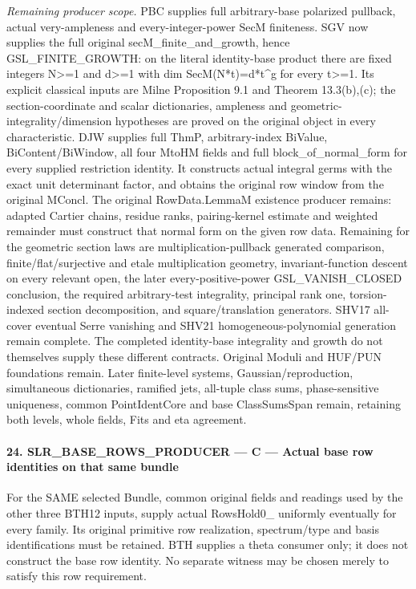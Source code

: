 \documentclass[11pt,a4paper]{article}
\numberwithin{equation}{section}
\theoremstyle{remark}\newtheorem{remark}[theorem]{Remark}
\begin{document}
\emph{Remaining producer scope.} PBC supplies full arbitrary-base polarized pullback, actual very-ampleness and every-integer-power SecM finiteness. SGV now supplies the full original secM\_\allowbreak finite\_\allowbreak and\_\allowbreak growth, hence GSL\_\allowbreak FINITE\_\allowbreak GROWTH: on the literal identity-base product there are fixed integers N>=1 and d>=1 with dim SecM(N*t)=d*t\textasciicircum{}g for every t>=1. Its explicit classical inputs are Milne Proposition 9.1 and Theorem 13.3(b),(c); the section-coordinate and scalar dictionaries, ampleness and geometric-integrality/dimension hypotheses are proved on the original object in every characteristic. DJW supplies full ThmP, arbitrary-index BiValue, BiContent/BiWindow, all four MtoHM fields and full block\_\allowbreak of\_\allowbreak normal\_\allowbreak form for every supplied restriction identity. It constructs actual integral germs with the exact unit determinant factor, and obtains the original row window from the original MConcl. The original RowData.LemmaM existence producer remains: adapted Cartier chains, residue ranks, pairing-kernel estimate and weighted remainder must construct that normal form on the given row data. Remaining for the geometric section laws are multiplication-pullback generated comparison, finite/flat/surjective and etale multiplication geometry, invariant-function descent on every relevant open, the later every-positive-power GSL\_\allowbreak VANISH\_\allowbreak CLOSED conclusion, the required arbitrary-test integrality, principal rank one, torsion-indexed section decomposition, and square/translation generators. SHV17 all-cover eventual Serre vanishing and SHV21 homogeneous-polynomial generation remain complete. The completed identity-base integrality and growth do not themselves supply these different contracts. Original Moduli and HUF/PUN foundations remain. Later finite-level systems, Gaussian/reproduction, simultaneous dictionaries, ramified jets, all-tuple class sums, phase-sensitive uniqueness, common PointIdentCore and base ClassSumsSpan remain, retaining both levels, whole fields, Fits and eta agreement.



\paragraph{24. SLR\_\allowbreak BASE\_\allowbreak ROWS\_\allowbreak PRODUCER — C — Actual base row identities on that same bundle}

For the SAME selected Bundle, common original fields and readings used by the other three BTH12 inputs, supply actual RowsHold0\_ uniformly eventually for every family. Its original primitive row realization, spectrum/type and basis identifications must be retained. BTH supplies a theta consumer only; it does not construct the base row identity. No separate witness may be chosen merely to satisfy this row requirement.
\end{document}
